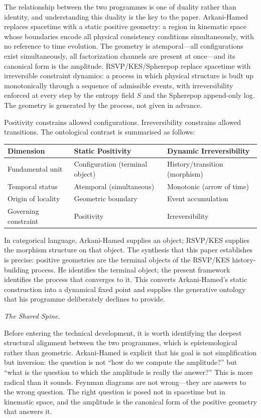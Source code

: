 \documentclass[11pt]{article}
\theoremstyle{plain}
\theoremstyle{definition}
\theoremstyle{remark}
\newcommand{\Sf}{S}
\begin{document}
The relationship between the two programmes is one of duality rather than identity, and understanding this duality is the key to the paper. Arkani-Hamed replaces spacetime with a static positive geometry: a region in kinematic space whose boundaries encode all physical consistency conditions simultaneously, with no reference to time evolution. The geometry is atemporal---all configurations exist simultaneously, all factorization channels are present at once---and its canonical form is the amplitude. RSVP/KES/Spherepop replace spacetime with irreversible constraint dynamics: a process in which physical structure is built up monotonically through a sequence of admissible events, with irreversibility enforced at every step by the entropy field $\Sf$ and the Spherepop append-only log. The geometry is generated by the process, not given in advance.

Positivity constrains allowed configurations. Irreversibility constrains allowed transitions. The ontological contrast is summarised as follows:

\begin{center}
\begin{tabular}{lll}
\toprule
Dimension & Static Positivity & Dynamic Irreversibility \\
\midrule
Fundamental unit & Configuration (terminal object) & History/transition (morphism) \\
Temporal status & Atemporal (simultaneous) & Monotonic (arrow of time) \\
Origin of locality & Geometric boundary & Event accumulation \\
Governing constraint & Positivity & Irreversibility \\
\bottomrule
\end{tabular}
\end{center}

In categorical language, Arkani-Hamed supplies an object; RSVP/KES supplies the morphism structure on that object. The synthesis that this paper establishes is precise: positive geometries are the terminal objects of the RSVP/KES history-building process. He identifies the terminal object; the present framework identifies the process that converges to it. This converts Arkani-Hamed's static construction into a dynamical fixed point and supplies the generative ontology that his programme deliberately declines to provide.

\medskip\noindent\textit{The Shared Spine.}

Before entering the technical development, it is worth identifying the deepest structural alignment between the two programmes, which is epistemological rather than geometric. Arkani-Hamed is explicit that his goal is not simplification but inversion: the question is not ``how do we compute the amplitude?'' but ``what is the question to which the amplitude is really the answer?'' This is more radical than it sounds. Feynman diagrams are not wrong---they are answers to the wrong question. The right question is posed not in spacetime but in kinematic space, and the amplitude is the canonical form of the positive geometry that answers it.
\end{document}
